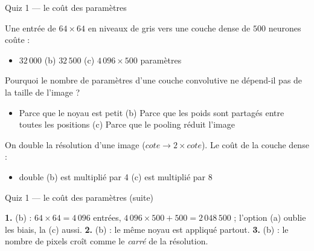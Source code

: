\begin{frame}{Quiz 1 --- le coût des paramètres}
\begin{qbox}[Question 1]
Une entrée de $64 \times 64$ en niveaux de gris vers une couche dense de
$500$ neurones coûte :
\begin{itemize}
  \item[(a)] $32\,000$ \quad (b) $32\,500$ \quad (c) $4\,096 \times 500$ paramètres
\end{itemize}
\end{qbox}
\begin{qbox}[Question 2]
Pourquoi le nombre de paramètres d'une couche convolutive ne dépend-il pas
de la taille de l'image ?
\begin{itemize}
  \item[(a)] Parce que le noyau est petit \quad (b) Parce que les poids sont
  partagés entre toutes les positions \quad (c) Parce que le pooling réduit l'image
\end{itemize}
\end{qbox}
\begin{qbox}[Question 3]
On double la résolution d'une image ($cote \to 2 \times cote$). Le coût de la
couche dense :
\begin{itemize}
  \item[(a)] double \quad (b) est multiplié par 4 \quad (c) est multiplié par 8
\end{itemize}
\end{qbox}

\end{frame}
\begin{frame}{Quiz 1 --- le coût des paramètres (suite)}
\begin{solbox}[Réponses]
\textbf{1.} (b) : $64 \times 64 = 4\,096$ entrées, $4\,096 \times 500 + 500 = 2\,048\,500$ ;
l'option (a) oublie les biais, la (c) aussi. \quad
\textbf{2.} (b) : le même noyau est appliqué partout. \quad
\textbf{3.} (b) : le nombre de pixels croît comme le \emph{carré} de la résolution.
\end{solbox}
\end{frame}
